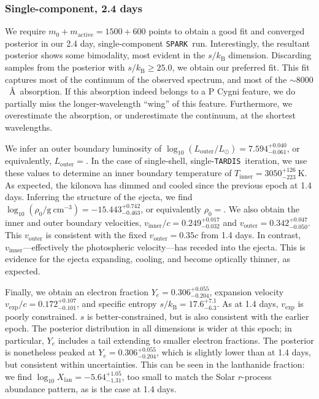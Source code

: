 \documentclass[twocolumn, twocolappendix]{aastex63}
\def\SPARK{\texttt{SPARK}}
\def\TARDIS{\texttt{TARDIS}}
\begin{document}
\subsubsection{Single-component, 2.4 days}\label{sssc:2.4_single}

We require $m_0 + m_{\mathrm{active}} = 1500 + 600$ points to obtain a good fit and converged posterior in our 2.4 day, single-component \SPARK~run. Interestingly, the resultant posterior shows some bimodality, most evident in the $s/k_{\mathrm{B}}$ dimension. Discarding samples from the posterior with $s/k_{\mathrm{B}} \geqslant 25.0$, we obtain our preferred fit. This fit captures most of the continuum of the observed spectrum, and most of the $\sim8000$~\AA~absorption. If this absorption indeed belongs to a P Cygni feature, we do partially miss the longer-wavelength ``wing'' of this feature. Furthermore, we overestimate the absorption, or underestimate the continuum, at the shortest wavelengths. 

We infer an outer boundary luminosity of $\log_{10} (L_{\mathrm{outer}}/L_{\odot}) = 7.594^{+0.040}_{-0.061}$, or equivalently, $L_{\mathrm{outer}} = $. In the case of single-shell, single-\TARDIS~iteration, we use these values to determine an inner boundary temperature of $T_{\mathrm{inner}} = 3050^{+126}_{-223}~\mathrm{K}$. As expected, the kilonova has dimmed and cooled since the previous epoch at 1.4 days. Inferring the structure of the ejecta, we find $\log_{10} (\rho_0 / \mathrm{g~cm^{-3}}) = -15.443^{+0.742}_{-0.463}$, or equivalently $\rho_0 = $. We also obtain the inner and outer boundary velocities, $v_{\mathrm{inner}}/c = 0.249^{+0.017}_{-0.032}$ and $v_{\mathrm{outer}} = 0.342^{+0.047}_{-0.050}$. This $v_{\mathrm{outer}}$ is consistent with the fixed $v_{\mathrm{outer}} = 0.35c$ from 1.4 days. In contrast, $v_{\mathrm{inner}}$---effectively the photospheric velocity---has receded into the ejecta. This is evidence for the ejecta expanding, cooling, and become optically thinner, as expected.  

Finally, we obtain an electron fraction $Y_e = 0.306^{+0.055}_{-0.204}$, expansion velocity $v_{\mathrm{exp}}/c = 0.172^{+0.107}_{-0.101}$, and specific entropy $s/k_{\mathrm{B}} = 17.6^{+7.1}_{-6.3}$. As at 1.4 days, $v_{\mathrm{exp}}$ is poorly constrained. $s$ is better-constrained, but is also consistent with the earlier epoch. The posterior distribution in all dimensions is wider at this epoch; in particular, $Y_e$ includes a tail extending to smaller electron fractions. The posterior is nonetheless peaked at $Y_e = 0.306^{+0.055}_{-0.204}$, which is slightly lower than at 1.4 days, but consistent within uncertainties. This can be seen in the lanthanide fraction: we find $\log_{10} X_{\mathrm{lan}} = -5.64^{+1.05}_{-1.31}$, too small to match the Solar $r$-process abundance pattern, as is the case at 1.4 days.
\end{document}
